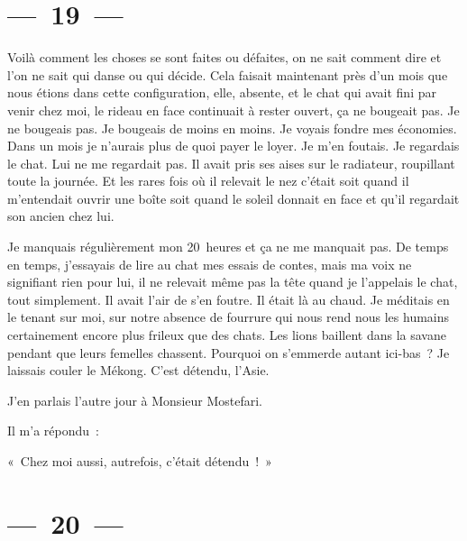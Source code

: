 \documentclass[french,twoside]{book} %
\begin{document}
\section[{— 19 —}]{— 19 —}
\renewcommand{\leftmark}{— 19 —}

\noindent Voilà comment les choses se sont faites ou défaites, on ne sait comment dire et l’on ne sait qui danse ou qui décide. Cela faisait maintenant près d’un mois que nous étions dans cette configuration, elle, absente, et le chat qui avait fini par venir chez moi, le rideau en face continuait à rester ouvert, ça ne bougeait pas. Je ne bougeais pas. Je bougeais de moins en moins. Je voyais fondre mes économies. Dans un mois je n’aurais plus de quoi payer le loyer. Je m’en foutais. Je regardais le chat. Lui ne me regardait pas. Il avait pris ses aises sur le radiateur, roupillant toute la journée. Et les rares fois où il relevait le nez c’était soit quand il m’entendait ouvrir une boîte soit quand le soleil donnait en face et qu’il regardait son ancien chez lui.\par
Je manquais régulièrement mon 20 heures et ça ne me manquait pas. De temps en temps, j’essayais de lire au chat mes essais de contes, mais ma voix ne signifiant rien pour lui, il ne relevait même pas la tête quand je l’appelais le chat, tout simplement. Il avait l’air de s’en foutre. Il était là au chaud. Je méditais en le tenant sur moi, sur notre absence de fourrure qui nous rend nous les humains certainement encore plus frileux que des chats. Les lions baillent dans la savane pendant que leurs femelles chassent. Pourquoi on s’emmerde autant ici-bas ? Je laissais couler le Mékong. C’est détendu, l’Asie.\par
J’en parlais l’autre jour à Monsieur Mostefari.\par
Il m’a répondu :\par
« Chez moi aussi, autrefois, c’était détendu ! »

\section[{— 20 —}]{— 20 —}
\renewcommand{\leftmark}{— 20 —}
\end{document}
